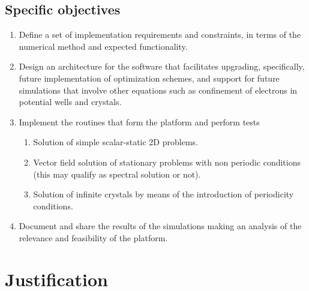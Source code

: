 \subsection{Specific objectives}
\begin{enumerate}
\item Define a set of implementation requirements and constraints, in terms of the numerical method\remove[SEC]{,} and expected functionality.  
\item Design an architecture for the software that facilitates upgrading, specifically, future implementation of optimization schemes, and support for future simulations that involve other equations such as confinement of electrons in potential wells and crystals.
\item Implement the routines that form the platform and perform tests   
	\begin{enumerate}
	\item Solution of simple scalar-static 2D problems.
	\item Vector field solution of stationary problems with non periodic conditions (this may qualify as spectral solution or not).
	\item Solution of infinite crystals by means of the introduction of periodicity conditions.
	\end{enumerate}

\item Document and share the results of the simulations making an analysis of the relevance and feasibility of the platform. 
\end{enumerate}

\section{Justification}

